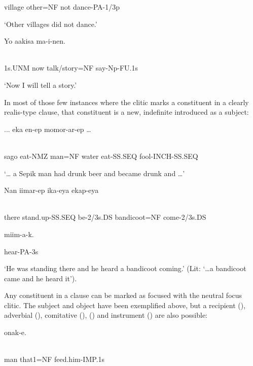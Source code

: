 village  other=NF  not  dance-PA-1/3p

`Other villages did not dance.'

\ea%
\label{ex:x1722}
\gll Yo  aakisa    ma-i-nen. \\
      \\
\glt
\z

1s.UNM  now  talk/story=NF  say-Np-FU.1s

`Now I will tell a story.'

In most of those few instances where the  clitic marks a constituent in a clearly realis-type clause, that constituent is a new, indefinite  introduced as a subject:

\ea%
\label{ex:x1733}
\gll ...  eka  en-ep  momor-ar-ep  {\dots} \\
      \\
\glt
\z

sago  eat-NMZ  man=NF  water  eat-SS.SEQ  fool-INCH-SS.SEQ

`{\dots} a Sepik man had drunk beer and became drunk and {\dots}'

\ea%
\label{ex:x1732}
\gll Nan  iimar-ep  ika-eya    ekap-eya \\
      \\
\glt
\z

there  stand.up-SS.SEQ  be-2/3s.DS  bandicoot=NF  come-2/3s.DS

miim-a-k.

hear-PA-3s

`He was standing there and he heard a bandicoot coming.' (Lit: `{\dots}a bandicoot came and he heard it').

Any constituent in a clause can be marked as focused with the neutral focus clitic. The subject and object have been exemplified above, but a recipient (), adverbial (), comitative (), () and instrument () are also possible:

\ea%
\label{ex:x1723}
\gll {}   onak-e. \\
      \\
\glt
\z

man  that1=NF  feed.him-IMP.1s

